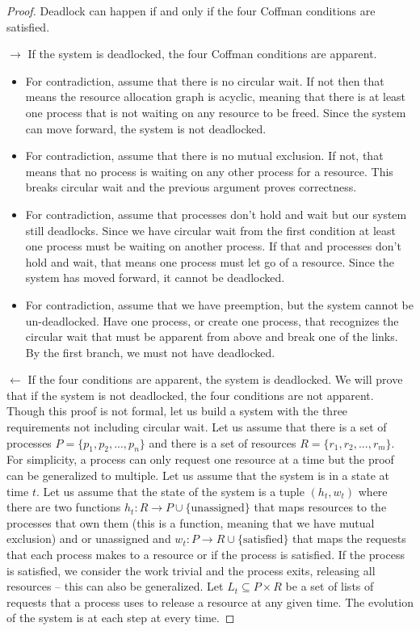 \begin{proof} Deadlock can happen if and only if the four Coffman conditions are satisfied.
	
	$\rightarrow$ If the system is deadlocked, the four Coffman conditions are apparent.
	
	\begin{itemize}
		\item For contradiction, assume that there is no circular wait. If not then that means the resource allocation graph is acyclic, meaning that there is at least one process that is not waiting on any resource to be freed. Since the system can move forward, the system is not deadlocked.
		\item For contradiction, assume that there is no mutual exclusion. If not, that means that no process is waiting on any other process for a resource. This breaks circular wait and the previous argument proves correctness.
		\item For contradiction, assume that processes don't hold and wait but our system still deadlocks. Since we have circular wait from the first condition at least one process must be waiting on another process. If that and processes don't hold and wait, that means one process must let go of a resource. Since the system has moved forward, it cannot be deadlocked.
		\item For contradiction, assume that we have preemption, but the system cannot be un-deadlocked. Have one process, or create one process, that recognizes the circular wait that must be apparent from above and break one of the links. By the first branch, we must not have deadlocked.
	\end{itemize}
	
	$\leftarrow$ If the four conditions are apparent, the system is deadlocked.
	We will prove that if the system is not deadlocked, the four conditions are not apparent.
	Though this proof is not formal, let us build a system with the three requirements not including circular wait.
	Let us assume that there is a set of processes $P = \{p_1, p_2, ..., p_n\}$ and there is a set of resources $R = \{r_1, r_2, ..., r_m\}$.
	For simplicity, a process can only request one resource at a time but the proof can be generalized to multiple.
	Let us assume that the system is in a state at time $t$.
	Let us assume that the state of the system is a tuple $(h_t, w_t)$ where there are two functions $h_t: R \rightarrow P \cup \{\text{unassigned}\}$ that maps resources to the processes that own them (this is a function, meaning that we have mutual exclusion) and or unassigned and $w_t: P \rightarrow R \cup \{\text{satisfied}\}$ that maps the requests that each process makes to a resource or if the process is satisfied.
	If the process is satisfied, we consider the work trivial and the process exits, releasing all resources -- this can also be generalized.
	Let $L_t \subseteq P \times R$ be a set of lists of requests that a process uses to release a resource at any given time.
	The evolution of the system is at each step at every time.
	

\end{proof}

